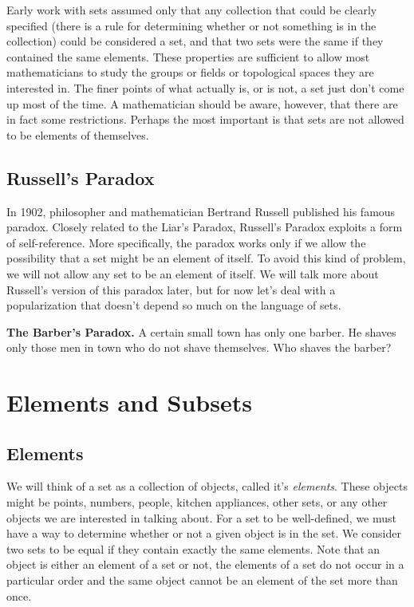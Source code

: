 Early work with sets assumed only that any collection that could be clearly specified (there is a rule for determining whether or not something is in the collection) could be considered a set, and that two sets were the same if they contained the same elements. These properties are sufficient to allow most mathematicians to study the groups or fields or topological spaces they are interested in.  The finer points of what actually is, or is not, a set just don't come up most of the time. A mathematician should be aware, however, that there are in fact some restrictions.  Perhaps the most important is that sets are not allowed to be elements of themselves. 

\subsection{Russell's Paradox}

In 1902, philosopher and mathematician Bertrand Russell published his famous paradox.  Closely related to the Liar's Paradox, Russell's Paradox exploits a form of self-reference.  More specifically, the paradox works only if we allow the possibility that a set might be an element of itself.  To avoid this kind of problem, we will not allow any set to be an element of itself.  We will talk more about Russell's version of this paradox later, but for now let's deal with a popularization that doesn't depend so much on the language of sets.

\begin{example}\label{eg:barber}
{\bf The Barber's Paradox.} A certain small town has only one barber. He shaves only those men in town who do not shave themselves. Who shaves the barber?
\end{example}

\section{Elements and Subsets}

\subsection{Elements}

We will think of a set as a collection of objects, called it's \emph{elements}.  These objects might be points, numbers, people, kitchen appliances, other sets, or any other objects we are interested in talking about.  For a set to be well-defined, we must have a way to determine whether or not a given object is in the set.  We consider two sets to be equal if they contain exactly the same elements.  Note that an object is either an element of a set or not, the elements of a set do not occur in a particular order and the same object cannot be an element
of the set more than once.

